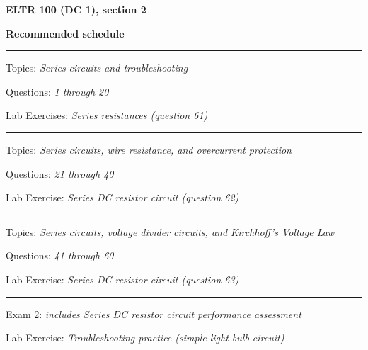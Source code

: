 
\centerline{\bf ELTR 100 (DC 1), section 2} \bigskip 
 
\vskip 10pt

\noindent
{\bf Recommended schedule}

\vskip 5pt

\hrule \vskip 5pt
\noindent
{}

\hskip 10pt Topics: {\it Series circuits and troubleshooting}
 
\hskip 10pt Questions: {\it 1 through 20}
 
\hskip 10pt Lab Exercises: {\it Series resistances (question 61)}
 

\vskip 10pt
\hrule \vskip 5pt
\noindent
{}

\hskip 10pt Topics: {\it Series circuits, wire resistance, and overcurrent protection}
 
\hskip 10pt Questions: {\it 21 through 40}
 
\hskip 10pt Lab Exercise: {\it Series DC resistor circuit (question 62)}
 

\vskip 10pt
\hrule \vskip 5pt
\noindent
{}

\hskip 10pt Topics: {\it Series circuits, voltage divider circuits, and Kirchhoff's Voltage Law}
 
\hskip 10pt Questions: {\it 41 through 60}
 
\hskip 10pt Lab Exercise: {\it Series DC resistor circuit (question 63)}
 



\vskip 10pt
\hrule \vskip 5pt
\noindent
{}

\hskip 10pt Exam 2: {\it includes Series DC resistor circuit performance assessment}
 
\hskip 10pt Lab Exercise: {\it Troubleshooting practice (simple light bulb circuit)}
 
